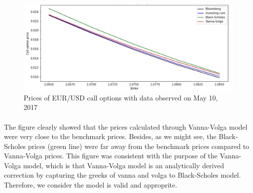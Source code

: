 \begin{figure}[htb]
	\centering
\includegraphics[scale=0.5]{./Testing-data/EURUSD-prices.png} 
\caption{Prices of EUR/USD call options with data observed on May 10, 2017}
\label{fig:prices-label} %
\end{figure}

\paragraph{}
The figure clearly showed that the prices calculated through Vanna-Volga model were very close to the benchmark prices. Besides, as we might see, the Black-Scholes prices (green line) were far away from the benchmark prices compared to Vanna-Volga prices. This figure was consistent with the purpose of the Vanna-Volga model, which is that Vanna-Volga model is an analytically derived correction by capturing the greeks of vanna and volga to Black-Scholes model. Therefore, we consider the model is valid and approprite.